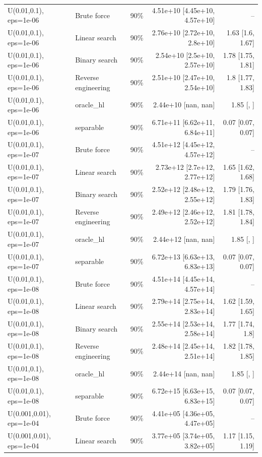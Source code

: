 \begin{tabular}{llrrr}
U(0.01,0.1), eps=1e-06 & Brute force & 90\% & 4.51e+10 [4.45e+10, 4.57e+10] & -- \\
U(0.01,0.1), eps=1e-06 & Linear search & 90\% & 2.76e+10 [2.72e+10, 2.8e+10] & 1.63 [1.6, 1.67] \\
U(0.01,0.1), eps=1e-06 & Binary search & 90\% & 2.54e+10 [2.5e+10, 2.57e+10] & 1.78 [1.75, 1.81] \\
U(0.01,0.1), eps=1e-06 & Reverse engineering & 90\% & 2.51e+10 [2.47e+10, 2.54e+10] & 1.8 [1.77, 1.83] \\
U(0.01,0.1), eps=1e-06 & oracle_hl & 90\% & 2.44e+10 [nan, nan] & 1.85 [, ] \\
U(0.01,0.1), eps=1e-06 & separable & 90\% & 6.71e+11 [6.62e+11, 6.84e+11] & 0.07 [0.07, 0.07] \\
U(0.01,0.1), eps=1e-07 & Brute force & 90\% & 4.51e+12 [4.45e+12, 4.57e+12] & -- \\
U(0.01,0.1), eps=1e-07 & Linear search & 90\% & 2.73e+12 [2.7e+12, 2.77e+12] & 1.65 [1.62, 1.68] \\
U(0.01,0.1), eps=1e-07 & Binary search & 90\% & 2.52e+12 [2.48e+12, 2.55e+12] & 1.79 [1.76, 1.83] \\
U(0.01,0.1), eps=1e-07 & Reverse engineering & 90\% & 2.49e+12 [2.46e+12, 2.52e+12] & 1.81 [1.78, 1.84] \\
U(0.01,0.1), eps=1e-07 & oracle_hl & 90\% & 2.44e+12 [nan, nan] & 1.85 [, ] \\
U(0.01,0.1), eps=1e-07 & separable & 90\% & 6.72e+13 [6.63e+13, 6.83e+13] & 0.07 [0.07, 0.07] \\
U(0.01,0.1), eps=1e-08 & Brute force & 90\% & 4.51e+14 [4.45e+14, 4.57e+14] & -- \\
U(0.01,0.1), eps=1e-08 & Linear search & 90\% & 2.79e+14 [2.75e+14, 2.83e+14] & 1.62 [1.59, 1.65] \\
U(0.01,0.1), eps=1e-08 & Binary search & 90\% & 2.55e+14 [2.53e+14, 2.58e+14] & 1.77 [1.74, 1.8] \\
U(0.01,0.1), eps=1e-08 & Reverse engineering & 90\% & 2.48e+14 [2.45e+14, 2.51e+14] & 1.82 [1.78, 1.85] \\
U(0.01,0.1), eps=1e-08 & oracle_hl & 90\% & 2.44e+14 [nan, nan] & 1.85 [, ] \\
U(0.01,0.1), eps=1e-08 & separable & 90\% & 6.72e+15 [6.63e+15, 6.83e+15] & 0.07 [0.07, 0.07] \\
U(0.001,0.01), eps=1e-04 & Brute force & 90\% & 4.41e+05 [4.36e+05, 4.47e+05] & -- \\
U(0.001,0.01), eps=1e-04 & Linear search & 90\% & 3.77e+05 [3.74e+05, 3.82e+05] & 1.17 [1.15, 1.19] \\

\end{tabular}
